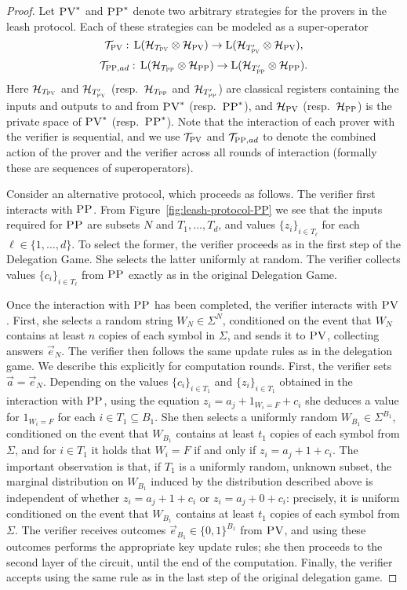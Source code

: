 \documentclass[11pt]{article}
\newcommand{\setft}[1]{\mathrm{#1}}
\newcommand{\Lin}{\setft{L}}
\newcommand{\mH}{\mathcal{H}}
\newcommand{\pv}{\textsc{PV}}
\newcommand{\pp}{\textsc{PP}}
\begin{document}
\begin{proof}
Let $\pv^*$ and $\pp^*$ denote two arbitrary strategies for the provers in the leash protocol. Each of these strategies can be modeled as a super-operator 
$$\mathcal{T}_\pv:\, \Lin(\mH_{T_\pv} \otimes \mH_\pv) \to \Lin(\mH_{T'_\pv} \otimes \mH_\pv),$$
$$\mathcal{T}_{\pp,ad}: \,\Lin(\mH_{T_\pp} \otimes \mH_\pp) \to \Lin(\mH_{T'_\pp} \otimes \mH_\pp).$$
Here $\mH_{T_\pv}$ and $\mH_{T'_\pv}$ (resp.\ $\mH_{T_\pp}$ and $\mH_{T'_\pp}$) are classical registers containing the inputs and outputs to and from $\pv^*$ (resp.\ $\pp^*$), and $\mH_\pv$ (resp.\ $\mH_\pp$) is the private space of $\pv^*$ (resp.\ $\pp^*$). Note that the interaction of each prover with the verifier is sequential, and we use $\mathcal{T}_{\pv}$ and $\mathcal{T}_{\pp,ad}$ to denote the combined action of the prover and the verifier across all rounds of interaction (formally these are sequences of superoperators).

Consider an alternative protocol, which proceeds as follows. The verifier first interacts with $\pp$. From Figure~\ref{fig:leash-protocol-PP} we see that the inputs required for $\pp$ are subsets $N$ and $T_1,\ldots,T_d$, and values $\{z_i\}_{i\in T_\ell}$ for each $\ell\in\{1,\ldots,d\}$. To select the former, the verifier proceeds as in the first step of the Delegation Game. She selects the latter uniformly at random. The verifier collects values $\{c_i\}_{i\in T_\ell}$ from $\pp$ exactly as in the original Delegation Game. 

Once the interaction with $\pp$ has been completed, the verifier interacts with $\pv$. First, she selects a random string $W_N\in \Sigma^N$, conditioned on the event that $W_N$ contains at least $n$ copies of each symbol in $\Sigma$, and sends it to $\pv$, collecting answers $\vec{e}_N$. The verifier then follows the same update rules as in the delegation game. We describe this explicitly for computation rounds. First, the verifier sets $\vec{a} = \vec{e}_N$. Depending on the values $\{c_i\}_{i\in T_1}$ and $\{z_i\}_{i\in T_1}$ obtained in the interaction with $\pp$, using the equation $z_i = a_j + 1_{W_i=F}+c_i$ she deduces a value for $1_{W_i=F}$ for each $i\in T_1 \subseteq B_1$. She then selects a uniformly random $W_{B_1} \in \Sigma^{B_1}$, conditioned on the event that $W_{B_1}$ contains at least $t_1$ copies of each symbol from $\Sigma$, and for $i\in T_1$ it holds that $W_i=F$ if and only if $z_i = a_j + 1+c_i$. The important observation is that, if $T_1$ is a uniformly random, unknown subset, the marginal distribution on $W_{B_1}$ induced by the distribution described above is independent of whether $z_i = a_j + 1+c_i$ or $z_i = a_j + 0 +c_i$: precisely, it is uniform conditioned on the event that $W_{B_1}$ contains at least $t_1$ copies of each symbol from $\Sigma$. 
The verifier receives outcomes $\vec{e}_{B_1}\in \{0,1\}^{B_1}$ from $\pv$, and using these outcomes performs the appropriate key update rules; she then proceeds to the second layer of the circuit, until the end of the computation. Finally, the verifier accepts using the same rule as in the last step of the original delegation game. 


\end{proof}
\end{document}
